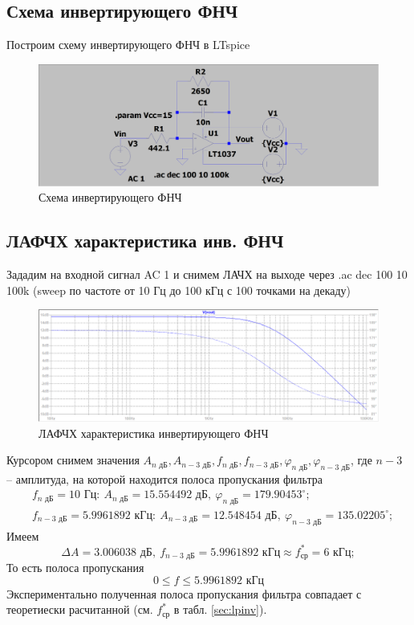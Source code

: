 \documentclass[a4paper, 12pt]{article}
\begin{document}
    \subsection{Схема инвертирующего ФНЧ}
    Построим схему инвертирующего ФНЧ в LTspice
    \begin{figure}[H]
        \centering
        \includegraphics[scale=0.22]{scheme1.png}
        \captionsetup{skip=0pt}
        \caption{Схема инвертирующего ФНЧ}
        \label{fig:scheme1}
    \end{figure}


    \subsection{ЛАФЧХ характеристика инв. ФНЧ}
    Зададим на входной сигнал AC 1 и снимем ЛАЧХ на выходе через .ac dec 100 10 100k (sweep по частоте от 10 Гц до 100 кГц с 100 точками на декаду)
    \begin{figure}[H]
        \centering
        \includegraphics[scale=0.46]{1task_lapfr.png}
        \captionsetup{skip=0pt}
        \caption{ЛАФЧХ характеристика инвертирующего ФНЧ}
        \label{fig:1task_lapfr}
    \end{figure}
    \noindent Курсором снимем значения $A_{n\text{ дБ}},A_{n-3\text{ дБ}},f_{n\text{ дБ}}, f_{n-3\text{ дБ}},\varphi_{n\text{ дБ}}, \varphi_{n-3\text{ дБ}}$,
    где $n-3$ -- амплитуда, на которой находится полоса пропускания фильтра
    \begin{align*}
    &f_{n\text{ дБ}}=10\text{ Гц}:\ A_{n\text{ дБ}}=15.554492\text{ дБ},\ \varphi_{n\text{ дБ}}=179.90453^{\circ};\\
    &f_{n-3\text{ дБ}}=5.9961892 \text{ кГц}:\ A_{n-3\text{ дБ}}=12.548454\text{ дБ},\ \varphi_{n-3\text{ дБ}}=135.02205^{\circ};
    \end{align*}
    Имеем
    $$
    \Delta A=3.006038\text{ дБ},\ f_{n-3\text{ дБ}}=5.9961892\text{ кГц}\approx f_\text{ср}^*=6\text{ кГц};
    $$
    То есть полоса пропускания
    $$
    0\leq f\leq 5.9961892\text{ кГц}
    $$
    Экспериментально полученная полоса пропускания фильтра совпадает с теоретиески расчитанной (см. $f_\text{ср}^*$ в табл. \ref{sec:lpinv}).
\end{document}
